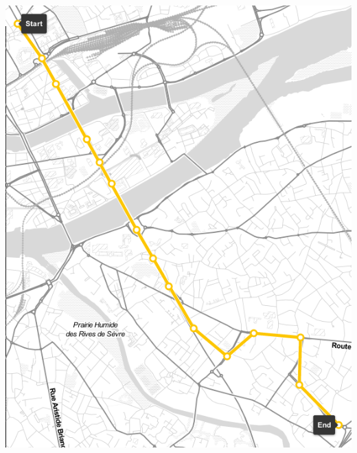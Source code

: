 \documentclass[table]{beamer}
\begin{document}
\begin{frame}
\begin{columns}
\begin{column}{0.3\linewidth}
      \includegraphics[width=\linewidth]{images/busway-map}      
    \end{column}
  \end{columns}
\end{frame}
\end{document}
